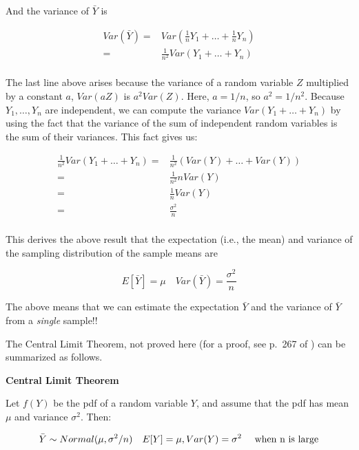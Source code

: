 \documentclass[12pt,]{krantz}
\begin{document}
And the variance of \(\bar{Y}\) is

\begin{equation}
\begin{split}
Var(\bar{Y}) =& Var(\frac{1}{n}Y_1 + \dots + \frac{1}{n}
Y_n)\\
=& \frac{1}{n^2} Var(Y_1 + \dots + Y_n)\\
\end{split}
\end{equation}

The last line above arises because the variance of a random variable \(Z\) multiplied by a constant \(a\), \(Var(aZ)\) is \(a^2 Var(Z)\). Here, \(a=1/n\), so \(a^2 = 1/n^2\).
Because \(Y_1,\dots,Y_n\) are independent, we can compute the variance \(Var(Y_1 + \dots + Y_n)\) by using the fact that the variance of the sum of independent random variables is the sum of their variances. This fact gives us:

\begin{equation} \label{sdsmderivation}
\begin{split}
\frac{1}{n^2} Var(Y_1 + \dots + Y_n) =& \frac{1}{n^2} (Var(Y) + \dots + Var(Y))\\
=&  \frac{1}{n^2}  n Var(Y)\\
=&  \frac{1}{n}  Var(Y)\\
=&  \frac{\sigma^2}{n}\\
\end{split}
\end{equation}

This derives the above result that the expectation (i.e., the mean) and variance of the sampling distribution of the sample means are

\begin{equation}
E[\bar{Y}] = \mu \quad Var(\bar{Y}) = \frac{\sigma^2}{n}
\end{equation}

The above means that we can estimate the expectation \(\bar{Y}\) and the variance of \(\bar{Y}\) from a \emph{single} sample!!

The Central Limit Theorem, not proved here (for a proof, see p.~267 of \citet{millermiller}) can be summarized as follows.

\textbf{Central Limit Theorem}

Let \(f(Y)\) be the pdf of a random variable \(Y\), and assume that the pdf has mean \(\mu\) and variance \(\sigma^2\). Then:

\begin{equation}
\bar{Y} \sim Normal(\mu,\sigma^2/n) \quad  E[Y]=\mu,Var(Y)=\sigma^2 \quad \hbox{ when n is large}
\end{equation}
\end{document}
